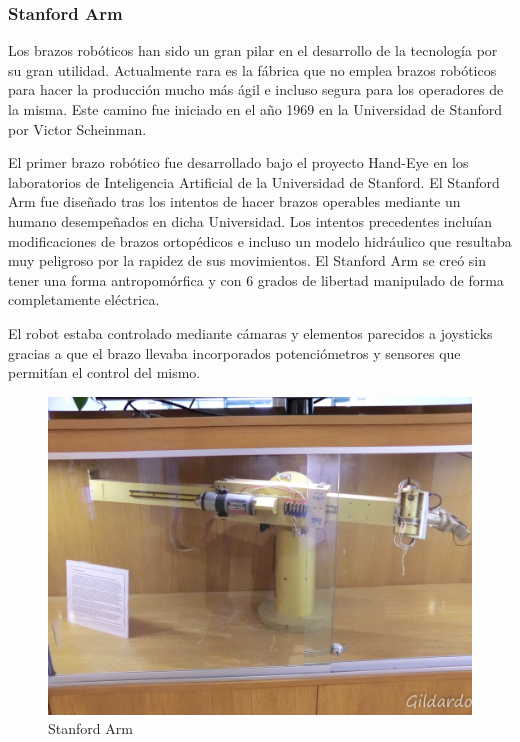 \subsubsection{Stanford Arm}

Los brazos robóticos han sido un gran pilar en el desarrollo de la tecnología por su gran utilidad. Actualmente rara es la fábrica que no emplea brazos robóticos para hacer la producción mucho más ágil e incluso segura para los operadores de la misma. Este camino fue iniciado en el año 1969 en la Universidad de Stanford por Victor Scheinman.

\vspace{10px}

El primer brazo robótico fue desarrollado bajo el proyecto Hand-Eye en los laboratorios de Inteligencia Artificial de la Universidad de Stanford. El Stanford Arm fue diseñado tras los intentos de hacer brazos operables mediante un humano desempeñados en dicha Universidad. Los intentos precedentes incluían modificaciones de brazos ortopédicos e incluso un modelo hidráulico que resultaba muy peligroso por la rapidez de sus movimientos. El Stanford Arm se creó sin tener una forma antropomórfica y con 6 grados de libertad manipulado de forma completamente eléctrica.

\vspace{10px}

El robot estaba controlado mediante cámaras y elementos parecidos a joysticks gracias a que el brazo llevaba incorporados potenciómetros y sensores que permitían el control del mismo.

\begin{figure}[!h]
	\centering
	\includegraphics[scale=0.3]{./EtapaModerna/Imagenes/stanford_arm.jpg}
	\caption{Stanford Arm}
	\label{fig:stanfordArm}
\end{figure}

